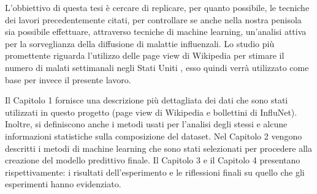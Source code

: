 L'obbiettivo di questa tesi è cercare di replicare, per quanto possibile, le tecniche dei lavori precedentemente citati, per
controllare se anche nella nostra penisola sia possibile effettuare, attraverso tecniche di machine learning, un'analisi
attiva per la sorveglianza della diffusione di malattie influenzali. Lo studio più promettente riguarda l'utilizzo delle
page view di Wikipedia per stimare il numero di malati settimanali negli Stati Uniti \cite{McIver2014}, esso quindi verrà
utilizzato come base per invece il presente lavoro. 
\bigskip

Il Capitolo 1 fornisce una descrizione più dettagliata dei dati che sono stati utilizzati in questo progetto
(page view di Wikipedia e bollettini di InfluNet). Inoltre, si definiscono anche i metodi usati per l'analisi degli stessi e 
alcune informazioni statistiche sulla composizione del dataset.
Nel Capitolo 2 vengono descritti i metodi di machine learning che sono stati selezionati per procedere alla creazione
del modello predittivo finale.
Il Capitolo 3 e il Capitolo 4 presentano rispettivamente: i risultati dell'esperimento e le riflessioni finali su quello che
gli esperimenti hanno evidenziato.
\newpage




